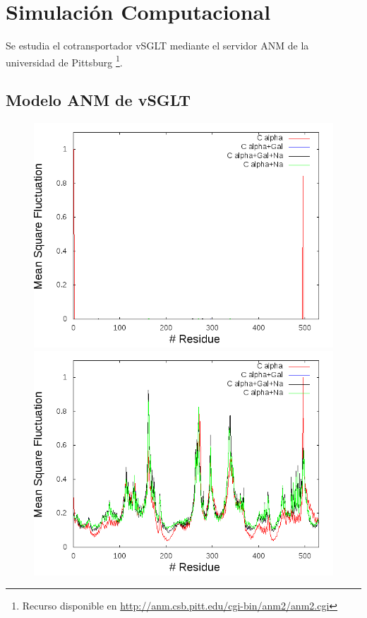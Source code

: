 \chapter{Simulaci\'{o}n Computacional}
Se estudia el cotransportador vSGLT mediante el servidor ANM de la universidad de Pittsburg \cite{Eyal2015}\footnote{Recurso disponible en \url{http://anm.csb.pitt.edu/cgi-bin/anm2/anm2.cgi}}. 
\section{Modelo ANM de vSGLT}
\begin{figure}
 \centering
  \includegraphics[scale=0.3]{./Kap4/ANM/ANM_server/grafica_7_A_n.png}
 \includegraphics[scale=0.3]{./Kap4/ANM/ANM_server/grafica_8_A_n.png}

\end{figure}
